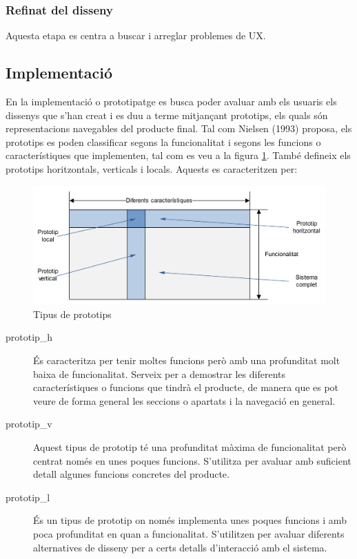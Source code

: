 \subsubsection{Refinat del disseny}
Aquesta etapa es centra a buscar i arreglar problemes de \ac{UX}.

\subsection{Implementació}\label{subsec:implementation}
En la implementació o prototipatge es busca poder avaluar amb els usuaris els dissenys que s'han creat i es duu a terme mitjançant prototips, els quals són representacions navegables del producte final. Tal com Nielsen (1993) \cite{Nielsen_1993} proposa, els prototips es poden classificar segons la funcionalitat i segons les funcions o característiques que implementen, tal com es veu a la figura \ref{fig:types_prototypes}. També defineix els prototips horitzontals, verticals i locals. Aquests es caracteritzen per:

\begin{figure}[ht]
\centering
\includegraphics[scale=0.8]{Types_prototypes.png}
\caption{Tipus de prototips}\label{fig:types_prototypes}
\end{figure}

\begin{description}
\item[\Gls{prototip_h}] És caracteritza per tenir moltes funcions però amb una profunditat molt baixa de funcionalitat. Serveix per a demostrar les diferents característiques o funcions que tindrà el producte, de manera que es pot veure de forma general les seccions o apartats i la navegació en general.
\item[\Gls{prototip_v}] Aquest tipus de prototip té una profunditat màxima de funcionalitat però centrat només en unes poques funcions. S'utilitza per avaluar amb suficient detall algunes funcions concretes del producte. 
\item[\Gls{prototip_l}] És un tipus de prototip on només implementa unes poques funcions i amb poca profunditat en quan a funcionalitat. S'utilitzen per avaluar diferents alternatives de disseny per a certs detalls d'interacció amb el sistema. 
\end{description}

